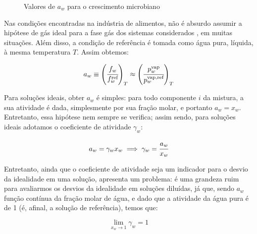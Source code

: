 \documentclass[
	12pt,				%
	openright,
	twoside,
	a4paper,			%
	english,			%
	french,				%
	spanish,			%
	brazil				%
	]{abntex2}
\begin{document}
\begin{figure}[h]
	\caption{Valores de $a_w$ para o crescimento microbiano}
	\label{fig:germ}
\end{figure}

Nas condições encontradas na indústria de alimentos, não é absurdo assumir a
hipótese de gás ideal para a fase gás dos sistemas
considerados \cite{canovas2007}, em muitas situações. Além disso, a condição de
referência é tomada como água pura, líquida, à mesma temperatura $T$. Assim
obtemos:

\begin{equation}
	\label{eq:def_atv}
	a_w \equiv \left(\cfrac{f_w}{f^\text{ref}_w}\right)_T%
		\approx \left(\cfrac{p^\text{vap}_w}{p^\text{vap,ref}_w}\right)_T
\end{equation}

Para soluções ideais, obter $a_w$ é simples: para todo componente $i$ da
mistura, a sua atividade é dada, simplesmente por sua fração molar, e portanto
$a_w = x_w$. Entretanto, essa hipótese nem sempre se verifica; assim sendo,
para soluções ideais adotamos o coeficiente de atividade $\gamma_w$:

\begin{equation}
	a_w = \gamma_wx_w \implies \gamma_w = \cfrac{a_w}{x_w}
\end{equation}

Entretanto, ainda que o coeficiente de atividade seja um indicador para o
desvio da idealidade em uma solução, apresenta um problema: é uma grandeza ruim
para avaliarmos os desvios da idealidade em soluções diluídas, já que, sendo
$a_w$ função contínua da fração molar de água, e dado que a atividade da água
pura é de 1 (é, afinal, a solução de referência), temos que:

\begin{equation}
	\lim_{x_w \to 1}\gamma_w = 1
\end{equation}
\end{document}
